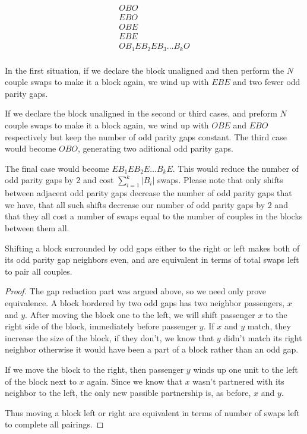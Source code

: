 \documentclass[11pt,twocolumn]{article}
\begin{document}
\begin{align*}
O B O \\
E B O \\
O B E \\
E B E \\
O B_1 E B_2 E B_3 \hdots B_k O \\
\end{align*}

In the first situation, if we declare the block unaligned and then perform the $N$ couple swaps to make it a block again, we wind up with $E B E$ and two fewer odd parity gaps.  

If we declare the block unaligned in the second or third cases, and preform $N$ couple swaps to make it a block again, we wind up with $O B E $ and $E B O$ respectively but keep the number of odd parity gaps constant.  The third case would become $O B O$, generating two aditional odd parity gaps.

The final case would become $E B_1 E B_2 E \hdots B_k E$.  This would reduce the number of odd parity gaps by 2 and cost $\sum_{i=1}^k |B_i|$ swaps.  Please note that only shifts between adjacent odd parity gaps decrease the number of odd parity gaps that we have, that all such shifts decrease our number of odd parity gaps by 2 and that they all cost a number of swaps equal to the number of couples in the blocks between them all.

\begin{lem} \label{lem:shiftLeftRightIdentical}
Shifting a block surrounded by odd gaps either to the right or left makes both of its odd parity gap neighbors even, and are equivalent in terms of total swaps left to pair all couples.
\end{lem}

\begin{proof}
The gap reduction part was argued above, so we need only prove equivalence.  A block bordered by two odd gaps has two neighbor passengers, $x$ and $y$.  After moving the block one to the left, we will shift passenger $x$ to the right side of the block, immediately before passenger $y$.  If $x$ and $y$ match, they increase the size of the block, if they don't, we know that $y$ didn't match its right neighbor otherwise it would have been a part of a block rather than an odd gap.

If we move the block to the right, then passenger $y$ winds up one unit to the left of the block next to $x$ again. Since we know that $x$ wasn't partnered with its neighbor to the left, the only new passible partnership is, as before, $x$ and $y$.

Thus moving a block left or right are equivalent in terms of number of swaps left to complete all pairings.
\end{proof}
\end{document}
